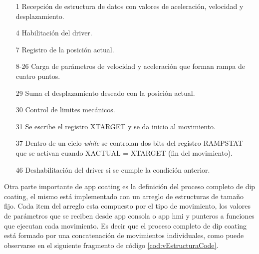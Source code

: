 \begin{itemize}
\item [1] Recepción de estructura de datos con valores de aceleración, velocidad y desplazamiento.
\item [4] Habilitación del driver.
\item [7] Registro de la posición actual.
\item [8-26] Carga de parámetros de velocidad y aceleración que forman rampa de cuatro puntos.
\item [29] Suma el desplazamiento deseado con la posición actual.
\item [30] Control de limites mecánicos.
\item [31] Se escribe el registro XTARGET y se da inicio al movimiento.
\item [37] Dentro de un ciclo \textit{while} se controlan dos bits del registro RAMPSTAT que se activan cuando XACTUAL = XTARGET (fin del movimiento).
\item [46] Deshabilitación del driver si se cumple la condición anterior.  
\end{itemize}


Otra parte importante de app coating es la definición del proceso completo de dip coating, el mismo está implementado con un arreglo de estructuras de tamaño fijo. Cada item del arreglo esta compuesto por el tipo de movimiento, los valores de parámetros que se reciben desde app consola o app hmi y punteros a funciones que ejecutan cada movimiento. Es decir que el proceso completo de dip coating está formado por una concatenación de movimientos individuales, como puede observarse en el siguiente fragmento de código \ref{cod:vEstructuraCode}.




